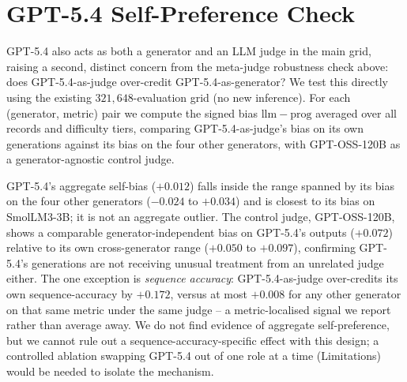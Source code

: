 \section{GPT-5.4 Self-Preference Check}
\label{app:self-preference}

GPT-5.4 also acts as both a generator and an LLM judge in the main grid, raising a second, distinct concern from the meta-judge robustness check above: does GPT-5.4-as-judge over-credit GPT-5.4-as-generator? We test this directly using the existing $321{,}648$-evaluation grid (no new inference). For each (generator, metric) pair we compute the signed bias $\mathrm{llm} - \mathrm{prog}$ averaged over all records and difficulty tiers, comparing GPT-5.4-as-judge's bias on its own generations against its bias on the four other generators, with GPT-OSS-120B as a generator-agnostic control judge.

\begin{table}[h!]
\centering
\small
\setlength{\tabcolsep}{4pt}
\renewcommand{\arraystretch}{1.1}
\caption{Judge=GPT-5.4 bias ($\mathrm{llm\_accuracy} - \mathrm{programmatic\_accuracy}$) by generator, averaged over all difficulty tiers. $^{\ast}$GPT-5.4 judging its own generations.}
\label{tab:self-preference}
\end{table}

GPT-5.4's aggregate self-bias ($+0.012$) falls inside the range spanned by its bias on the four other generators ($-0.024$ to $+0.034$) and is closest to its bias on SmolLM3-3B; it is not an aggregate outlier. The control judge, GPT-OSS-120B, shows a comparable generator-independent bias on GPT-5.4's outputs ($+0.072$) relative to its own cross-generator range ($+0.050$ to $+0.097$), confirming GPT-5.4's generations are not receiving unusual treatment from an unrelated judge either. The one exception is \emph{sequence accuracy}: GPT-5.4-as-judge over-credits its own sequence-accuracy by $+0.172$, versus at most $+0.008$ for any other generator on that same metric under the same judge -- a metric-localised signal we report rather than average away. We do not find evidence of aggregate self-preference, but we cannot rule out a sequence-accuracy-specific effect with this design; a controlled ablation swapping GPT-5.4 out of one role at a time (Limitations) would be needed to isolate the mechanism.

